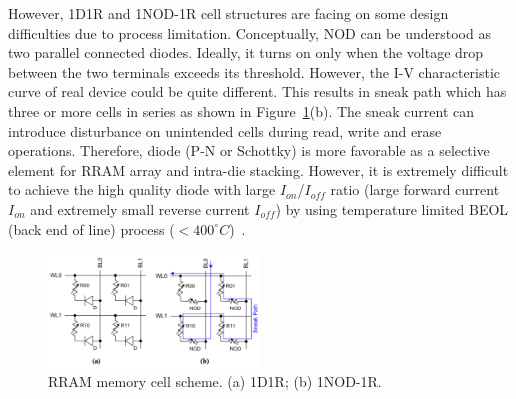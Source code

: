 However, 1D1R and 1NOD-1R cell structures are facing on some design difficulties due to process limitation. Conceptually, NOD can be understood as two parallel connected diodes. Ideally, it turns on only when the voltage drop between the two terminals exceeds its threshold. However, the I-V characteristic curve of real device could be quite different.
This results in sneak path which has three or more cells in series as shown in Figure~\ref{RRAM2}(b). The sneak current can introduce disturbance on unintended cells during read, write and erase operations. Therefore, diode (P-N or Schottky) is more favorable as a selective element for RRAM array and intra-die stacking. However, it is extremely difficult to achieve the high quality diode with large $I_{on}$/$I_{off}$ ratio (large forward current $I_{on}$ and extremely small reverse current $I_{off}$) by using temperature limited BEOL (back end of line) process ($<400 ^{\circ}C$)~\cite{Sun:147791}.

\begin{figure}\centering
\includegraphics[width=0.50\textwidth]{./figure/HL-RRAM2.png}
\caption{RRAM memory cell scheme. (a) 1D1R; (b) 1NOD-1R.}\label{RRAM2}
\end{figure}

